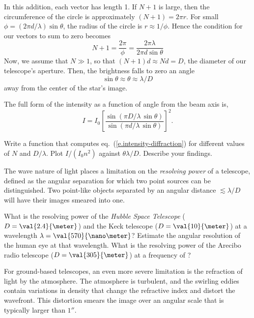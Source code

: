 In this addition, each vector has length 1. If $N+1$ is large, then the circumference of the circle is approximately $(N+1) = 2\pi r$.  For small $\phi = (2\pi d/\lambda)\sin\theta$, the radius of the circle is $r \approx 1/\phi$.  Hence the condition for our vectors to sum to zero becomes
\[ N+1 = \frac{2\pi}{\phi} = \frac{2\pi\lambda}{2\pi d\sin\theta} \]
Now, we assume that $N \gg 1$, so that $(N+1)d \approx Nd = D$, the diameter of our telescope's aperture.  Then, the brightness falls to zero an angle
\[ \sin\theta \approx \theta \approx\lambda/D\]
away from the center of the star's image.

The full form of the intensity as a function of angle from the beam axis is,
\begin{equation}\label{e.intensity-diffraction}
I = I_{0}\left[\frac{\sin\left(\pi D/\lambda\,\sin\theta\right)}{\sin\left(\pi d/\lambda\,\sin\theta\right)}\right]^{2}.
\end{equation}

\begin{exercisebox}
Write a  function that computes eq.~(\ref{e.intensity-diffraction}) for different values of $N$ and $D/\lambda$.  Plot $I/(I_{0}n^{2})$ against $\theta\lambda/D$.  Describe your findings.
\end{exercisebox}

The wave nature of light places a limitation on the \emph{resolving power} of a telescope, defined as the   angular separation for which two point sources can be distinguished.  Two point-like objects separated by an angular distance $\lesssim \lambda/D$ will have their images smeared into one.

\begin{exercisebox}
What is the resolving power of the \emph{Hubble Space Telescope} ($D=\val{2.4}{\meter}$) and the Keck telescope ($D=\val{10}{\meter}$) at a wavelength $\lambda = \val{570}{\nano\meter}$? Estimate the angular resolution of the human eye at that wavelength. What is the resolving power of the Arecibo radio telescope ($D = \val{305}{\meter}$) at a frequency of ?
\end{exercisebox}

For ground-based telescopes, an even more severe limitation is the refraction of light by the atmosphere. The atmosphere is turbulent, and the swirling eddies contain variations in density that change the refractive index and distort the wavefront.  This distortion smears the image over an angular scale that is typically larger than $1''$.

